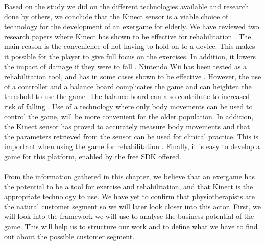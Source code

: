 Based on the study we did on the different technologies available and research done by others, we conclude that the Kinect sensor is a viable choice of technology for the development of an exergame for elderly. We have reviewed two research papers where Kinect has shown to be effective for rehabilitation \cite{kinect} \cite{garcia2012exergames}. The main reason is the convenience of not having to hold on to a device. This makes it possible for the player to give full focus on the exercises. In addition, it lowers the impact of damage if they were to fall \cite{garcia2012exergames}. Nintendo Wii has been tested as a rehabilitation tool, and has in some cases shown to be effective \cite{taylor2011activity} \cite{excell}. However, the use of a controller and a balance board complicates the game and can heighten the threshold to use the game. The balance board can also contribute to increased risk of falling \cite{exergamesforelderly}. Use of a technology where only body movements can be used to control the game, will be more convenient for the older population. In addition, the Kinect sensor has proved to accurately measure body movements and that the parameters retrieved from the sensor can be used for clinical practice. This is important when using the game for rehabilitation  \cite{garcia2012exergames}. Finally,  it is easy to develop a game for this platform, enabled by the free SDK offered.\\ \\
From the information gathered in this chapter, we believe that an exergame has the potential to be a tool for exercise and rehabilitation, and that Kinect is the appropriate technology to use. We have yet to confirm that physiotherapists are the natural customer segment so we will later look closer into this actor. First, we will look into the framework we will use to analyse the business potential of the game. This will help us to structure our work and to define what we have to find out about the possible customer segment. 




